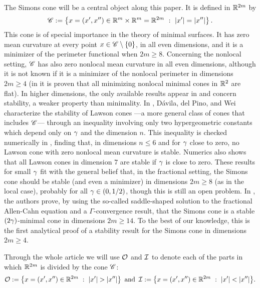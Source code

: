 The Simons cone will be a central object along this paper. It is defined in $\mathbb{R}^{2m}$ by
\begin{equation}
\label{Eq:SimonsCone}
\mathscr{C} := \left \{ x = (x', x'') \in \mathbb{R}^m \times \mathbb{R}^m=\mathbb{R}^{2m} \ : \ |x'| = |x''| \right \}.
\end{equation}
This cone is of special importance in the theory of minimal surfaces. It has zero mean curvature at every point $x\in \mathscr{C} \setminus \{0\}$, in all even dimensions, and it is a minimizer of the perimeter functional when $2m\geq 8$. Concerning the nonlocal setting, $\mathscr{C}$ has also zero nonlocal mean curvature in all even dimensions, although it is not known if it is a minimizer of the nonlocal perimeter in dimensions $2m\geq 4$ (in \cite{SavinValdinoci-Cones} it is proven that all minimizing nonlocal minimal cones in $\mathbb{R}^2$ are flat). In higher dimensions, the only available results appear in \cite{DaviladelPinoWei, Felipe-Sanz-Perela:SaddleFractional} and concern stability, a weaker property than minimality. In \cite{DaviladelPinoWei},  Dávila, del Pino, and Wei characterize the stability of Lawson cones ---a more general class of cones that includes $\mathscr{C}$--- through an inequality involving only two hypergeometric constants which depend only on $\gamma$ and the dimension $n$. This inequality is checked numerically in \cite{DaviladelPinoWei}, finding that, in dimensions $n \leq 6$ and for $\gamma$ close to zero, no Lawson cone with zero nonlocal mean curvature is stable. Numerics also shows that all Lawson cones in dimension $7$ are stable if $\gamma$ is close to zero. These results for small $\gamma$ fit with the general belief that, in the fractional setting, the Simons cone should be stable (and even a minimizer) in dimensions $2m \geq 8$ (as in the local case), probably for all $\gamma\in(0,1/2)$, though this is still an open problem. In \cite{Felipe-Sanz-Perela:SaddleFractional}, the authors prove, by using the so-called saddle-shaped solution to the fractional Allen-Cahn equation and a $\Gamma$-convergence result, that the Simons cone is a stable $(2\gamma)$-minimal cone in dimensions $2m\geq 14$. To the best of our knowledge, this is the first analytical proof of a stability result for the Simons cone in dimensions $2m \geq 4$.


Through the whole article we will use $\mathcal{O}$ and $\mathcal{I}$ to denote each of the parts in which $\mathbb{R}^{2m}$ is divided by the cone $\mathscr{C}$:
$$
\mathcal{O}:= \left \{ x = (x', x'') \in \mathbb{R}^{2m} \ : \ |x'| > |x''| \right \} \textrm{ and } \,
\mathcal{I}:= \left \{ x = (x', x'') \in \mathbb{R}^{2m} \ : \ |x'| < |x''| \right \}\!.
$$

